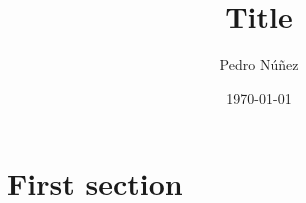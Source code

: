 \documentclass[11pt,A4]{article}
\title{Title}
\author{Pedro Núñez}
\date{\today}
\begin{document}
\maketitle

\tableofcontents

\section{First section}



\end{document}
